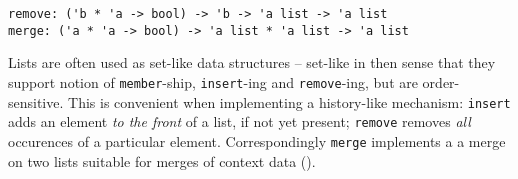 \begin{isabellebody}
\begin{isamarkuptext}
\begin{mldecls}
  \verb|remove: ('b * 'a -> bool) -> 'b -> 'a list -> 'a list| \\
  \verb|merge: ('a * 'a -> bool) -> 'a list * 'a list -> 'a list| \\
  \end{mldecls}%
\end{isamarkuptext}%
\isamarkuptrue%
%
\begin{isamarkuptext}%
Lists are often used as set-like data structures -- set-like in
  then sense that they support notion of \verb|member|-ship,
  \verb|insert|-ing and \verb|remove|-ing, but are order-sensitive.
  This is convenient when implementing a history-like mechanism:
  \verb|insert| adds an element \emph{to the front} of a list,
  if not yet present; \verb|remove| removes \emph{all} occurences
  of a particular element.  Correspondingly \verb|merge| implements a 
  a merge on two lists suitable for merges of context data
  ().


\end{isamarkuptext}
\end{isabellebody}
